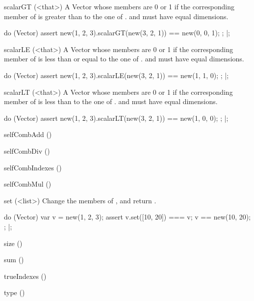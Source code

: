 \begin{urbiscriptapi}
\item[scalarGT](<that>)%
  A Vector whose members are 0 or 1 if the corresponding member of \this is
  greater than to the one of \that.  \this and \that must have equal
  dimensions.
\begin{urbiscript}
do (Vector)
{
  assert
  {
    new(1, 2, 3).scalarGT(new(3, 2, 1)) == new(0, 0, 1);
  };
}|;
\end{urbiscript}

\item[scalarLE](<that>)%
  A Vector whose members are 0 or 1 if the corresponding member of \this is
  less than or equal to the one of \that.  \this and \that must have equal
  dimensions.
\begin{urbiscript}
do (Vector)
{
  assert
  {
    new(1, 2, 3).scalarLE(new(3, 2, 1)) == new(1, 1, 0);
  };
}|;
\end{urbiscript}

\item[scalarLT](<that>)%
  A Vector whose members are 0 or 1 if the corresponding member of \this is
  less than to the one of \that.  \this and \that must have equal
  dimensions.
\begin{urbiscript}
do (Vector)
{
  assert
  {
    new(1, 2, 3).scalarLT(new(3, 2, 1)) == new(1, 0, 0);
  };
}|;
\end{urbiscript}

\item[selfCombAdd]()%

\item[selfCombDiv]()%

\item[selfCombIndexes]()%

\item[selfCombMul]()%

\item[set](<list>)%
  Change the members of \this, and return \this.
\begin{urbiscript}
do (Vector)
{
  var v = new(1, 2, 3);
  assert
  {
    v.set([10, 20]) === v;
    v == new(10, 20);
  };
}|;
\end{urbiscript}

\item[size]()%

\item[sum]()%

\item[trueIndexes]()%

\item[type]()%


\end{urbiscriptapi}
